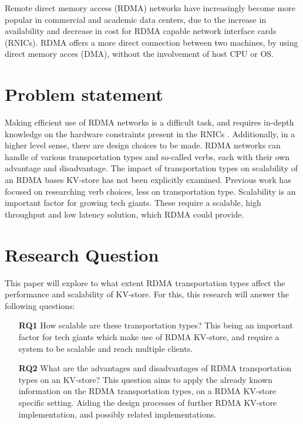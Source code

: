 Remote direct memory access (RDMA) networks have increasingly become more popular in commercial and academic data centers, due to the increase in availability and decrease in cost for RDMA capable network interface cards (RNICs).
RDMA offers a more direct connection between two machines, by using direct memory acces (DMA), without the involvement of host CPU or OS.

\section{Problem statement}
Making efficient use of RDMA networks is a difficult task, and requires in-depth knowledge on the hardware constraints present in the RNICs \cite{kalia2016designc,hen2019scalable}.
Additionally, in a higher level sense, there are design choices to be made.
RDMA networks can handle of various transportation types and so-called verbs, each with their own advantage and disadvantage.
The impact of transportation types on scalability of an RDMA bases KV-store has not been explicitly examined.
Previous work has focused on researching verb choices, less on transportation type\cite{kalia2014using, kalia2016fasst, mitchell2013using}.
Scalability is an important factor for growing tech giants.
These require a scalable, high throughput and low latency solution\cite{decandia2007dynamo}, which RDMA could provide.

\section{Research Question}
This paper will explore to what extent RDMA transportation types affect the performance and scalability of KV-store.
For this, this research will answer the following questions:

\begin{itemize}
    \item[\textbf{RQ1}] How scalable are these transportation types?%
    This being an important factor for tech giants which make use of RDMA KV-store, and require a system to be scalable and reach multiple clients.
    \item[\textbf{RQ2}] What are the advantages and disadvantages of RDMA transportation types on an KV-store?
    This question aims to apply the already known information on the RDMA transportation types, on a RDMA KV-store specific setting.
    Aiding the design processes of further RDMA KV-store implementation, and possibly related implementations.
\end{itemize}

